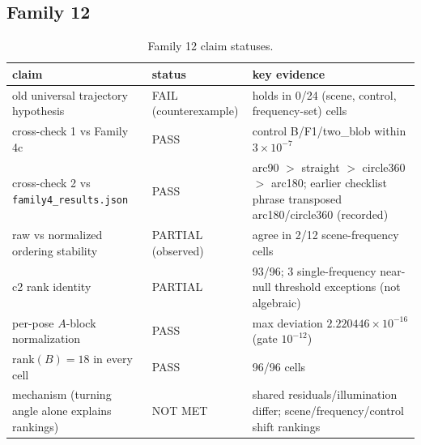 \documentclass[12pt]{article}
\begin{document}
\subsection{Family 12}
\begin{table}[ht]
\centering
\small
\caption{Family 12 claim statuses.}
\label{app:tab:f12}
\begin{tabular}{p{} p{} p{}}
\toprule
claim & status & key evidence \\
\midrule
old universal trajectory hypothesis & FAIL (counterexample) &
holds in 0/24 (scene, control, frequency-set) cells \\
cross-check 1 vs Family 4c & PASS &
control B/F1/two\_blob within $3\times10^{-7}$ \\
cross-check 2 vs \texttt{family4\_results.json} & PASS &
arc90 $>$ straight $>$ circle360 $>$ arc180; earlier checklist phrase
transposed arc180/circle360 (recorded) \\
raw vs normalized ordering stability & PARTIAL (observed) &
agree in 2/12 scene-frequency cells \\
c2 rank identity & PARTIAL &
93/96; 3 single-frequency near-null threshold exceptions (not algebraic) \\
per-pose $A$-block normalization & PASS &
max deviation $2.220446\times10^{-16}$ (gate $10^{-12}$) \\
$\mathrm{rank}(B)=18$ in every cell & PASS & 96/96 cells \\
mechanism (turning angle alone explains rankings) & NOT MET &
shared residuals/illumination differ; scene/frequency/control shift rankings \\
\bottomrule
\end{tabular}
\end{table}
\end{document}
